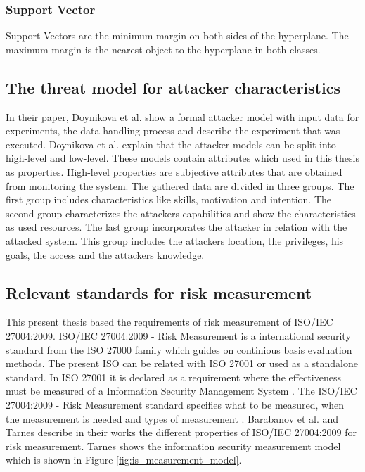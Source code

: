 \subsubsection*{Support Vector}

Support Vectors are the minimum margin on both sides of the hyperplane. The maximum margin is the nearest object to the hyperplane in both classes.

\subsection{The threat model for attacker characteristics}

In their paper, Doynikova et al. \cite{DBLP:conf/crisis/DoynikovaNGK20} show a formal attacker model with input data for experiments, the data handling process and describe the experiment
that was executed. Doynikova et al. explain that the attacker models can be split into high-level and low-level. These models contain attributes which used in this thesis as properties.
High-level properties are subjective attributes that are obtained from monitoring the system. The gathered data are divided in three groups. The first group includes characteristics like
skills, motivation and intention. The second group characterizes the attackers capabilities and show the characteristics as used resources. The last group incorporates the attacker in
relation with the attacked system. This group includes the attackers location, the privileges, his goals, the access and the attackers knowledge.

\subsection{Relevant standards for risk measurement}

This present thesis based the requirements of risk measurement of ISO/IEC 27004:2009. ISO/IEC 27004:2009 - Risk Measurement is a international security standard from the ISO 27000
\cite{DBLP:conf/euspn/MeriahR19} family which guides on continious basis evaluation methods. The present ISO can be related with ISO 27001 or used as a standalone standard. In ISO 27001
it is declared as a requirement where the effectiveness must be measured of a Information Security Management System \cite{barabanov2011information}. The ISO/IEC 27004:2009 - Risk
Measurement standard specifies what to be measured, when the measurement is needed and types of measurement \cite{lundholm2011design}. Barabanov et al. \cite{barabanov2011information} and
Tarnes \cite{tarnes2012information} describe in their works the different properties of ISO/IEC 27004:2009 for risk measurement. Tarnes shows the information security measurement model
which is shown in Figure \ref{fig:is_measurement_model}.


